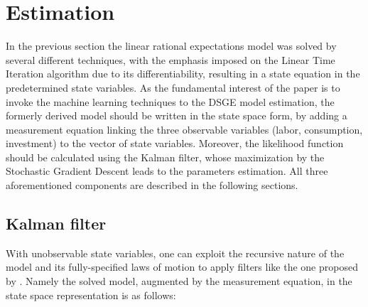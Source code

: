 \documentclass{pracamgr}
\numberwithin{equation}{section}
\newtheorem{mydef}{Definition}
\begin{document}
%
%
%

\chapter{Estimation} \label{Estimation}

In the previous section the linear rational expectations model was solved by several different techniques, with the emphasis imposed on the Linear Time Iteration algorithm due to its differentiability, resulting in a state equation in the predetermined state variables. As the fundamental interest of the paper is to invoke the machine learning techniques to the DSGE model estimation, the formerly derived model should be written in the state space form, by adding a measurement equation linking the three observable variables (labor, consumption, investment) to the vector of state variables. Moreover, the likelihood function should be calculated using the Kalman filter, whose maximization by the Stochastic Gradient Descent leads to the parameters estimation. All three aforementioned components are described in the following sections.

\section{Kalman filter}

With unobservable state variables, one can exploit the recursive nature of the model and its fully-specified laws of motion to apply filters like the one proposed by \citet{kalman1960new}. Namely the solved model, augmented by the measurement equation, in the state space representation is as follows:
\end{document}
